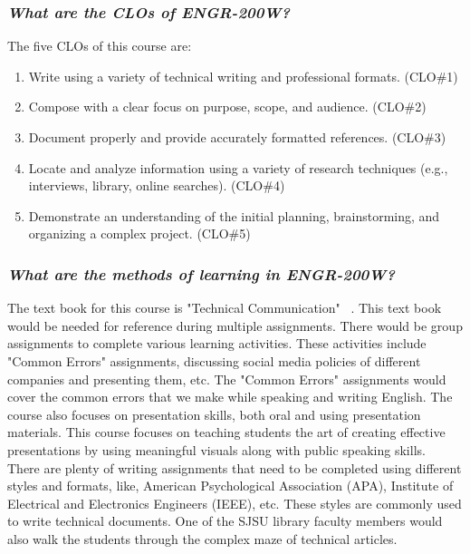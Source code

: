 \documentclass[letterpaper,12pt]{texMemo}
\begin{document}
\begin{singlespacing}
\subsubsection*{\textit{What are the CLOs of ENGR-200W?}}
The five CLOs of this course are:  
\begin{enumerate}
        \item Write using a variety of technical writing and professional formats. (CLO\#1)
        \item Compose with a clear focus on purpose, scope, and audience. (CLO\#2)
        \item Document properly and provide accurately formatted references. (CLO\#3)
        \item Locate and analyze information using a variety of research techniques (e.g., interviews, library, online searches). (CLO\#4)
        \item Demonstrate an understanding of the initial planning, brainstorming, and organizing a complex project. (CLO\#5)
\end{enumerate}
\subsubsection*{\textit{What are the methods of learning in ENGR-200W?}}
The text book for this course is "Technical Communication" ~\citep{markel_selber_2018}. This text book would be needed for reference during multiple assignments. There would be group assignments to complete various learning activities. These activities include "Common Errors" assignments, discussing social media policies of different companies and presenting them, etc. The "Common Errors" assignments would cover the common errors that we make while speaking and writing English. The course also focuses on presentation skills, both oral and using presentation materials. This course focuses on teaching students the art of creating effective presentations by using meaningful visuals along with public speaking skills.\\
There are plenty of writing assignments that need to be completed using different styles and formats, like, American Psychological Association (APA), Institute of Electrical and Electronics Engineers (IEEE), etc. These styles are commonly used to write technical documents. One of the SJSU library faculty members would also walk the students through the complex maze of technical articles.

\end{singlespacing}
\end{document}
